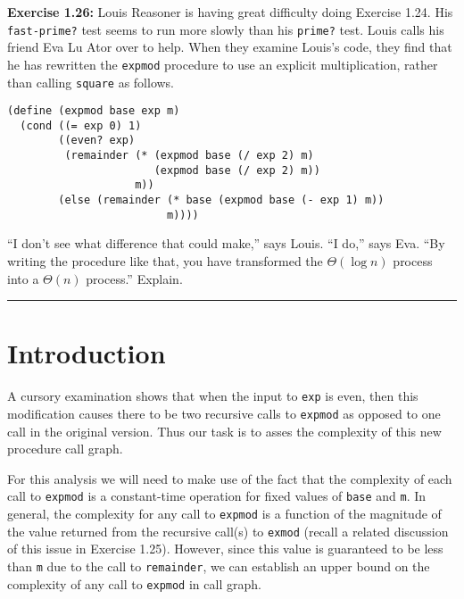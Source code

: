 \documentclass{article}
\begin{document}

\noindent \textbf{Exercise 1.26:} Louis Reasoner is having great difficulty
doing Exercise 1.24.  His \lstinline{fast-prime?} test seems to run more slowly
than his \lstinline{prime?} test.  Louis calls his friend Eva Lu Ator over to
help.  When they examine Louis's code, they find that he has rewritten the
\lstinline{expmod} procedure to use an explicit multiplication, rather than
calling \lstinline{square} as follows. \vspace{1mm}

\begin{lstlisting}[style=scheme]
(define (expmod base exp m)
  (cond ((= exp 0) 1)
        ((even? exp)
         (remainder (* (expmod base (/ exp 2) m)
                       (expmod base (/ exp 2) m))
                    m))
        (else (remainder (* base (expmod base (- exp 1) m))
                         m))))
\end{lstlisting}
``I don't see what difference that could make,'' says Louis.  ``I do,'' says
Eva.  ``By writing the procedure like that, you have transformed the
$\Theta(\log n)$ process into a $\Theta(n)$ process.''  Explain.

\vspace{3mm}
\hrule




\section{Introduction}

A cursory examination shows that when the input to \lstinline{exp} is even, then
this modification causes there to be two recursive calls to \lstinline{expmod}
as opposed to one call in the original version.  Thus our task is to asses the
complexity of this new procedure call graph.

For this analysis we will need to make use of the fact that the complexity of
each call to \lstinline{expmod} is a constant-time operation for fixed values of
\lstinline{base} and \lstinline{m}.  In general, the complexity for any call to
\lstinline{expmod} is a function of the magnitude of the value returned from the
recursive call(s) to \lstinline{exmod} (recall a related discussion of this
issue in Exercise 1.25).  However, since this value is guaranteed to be less
than \lstinline{m} due to the call to \lstinline{remainder}, we can establish an
upper bound on the complexity of any call to \lstinline{expmod} in call graph.
\end{document}
